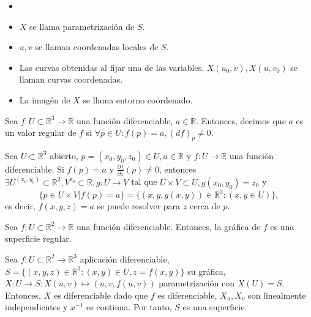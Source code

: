 \begin{nota}
  \begin{itemize}
    \item []
    \item $X$ se llama parametrización de $S$.
    \item $u, v$ se llaman coordenadas locales de $S$.
    \item Las curvas obtenidas al fijar una de las variables, $X(u_{0}, v), X(u, v_{0})$ se llaman curvas coordenadas.
    \item La imagén de $X$ se llama entorno coordenado.
  \end{itemize}
\end{nota} 

\begin{defn}
  Sea $ f: U \subset \mathbb{R}^{3} \to \mathbb{R}$ una función diferenciable, $a \in \mathbb{R}$. Entonces, decimos que $a$ es un valor regular de $f$ si $\forall p \in U : f(p) = a, (df)_{p} \neq 0$.
\end{defn}

\begin{theo}
  Sea $U \subset \mathbb{R}^{3}$ abierto, $p = (x_{0}, y_{0}, z_{0}) \in U, a \in \mathbb{R}$ y $f: U \to \mathbb{R}$ una función diferenciable. Si $f(p) = a$ y $\frac{\partial{f}}{\partial{z}}(p) \neq 0$, entonces $\exists U^{(x_{0},y_{0})} \subset \mathbb{R}^{2}, V^{z_{0}} \subset \mathbb{R}, g: U \to V$ tal que $U \times V \subset U, g(x_{0}, y_{0}) = z_{0}$ y
  \[ 
    \{ p \in U \times V | f(p) = a \} = \big\{ (x,y,g(x,y)) \in \mathbb{R}^{3} : (x,y \in U) \big\} ,
  \] 
  es decir, $f(x,y,z) = a$ se puede resolver para $z$ cerca de $p$.
\end{theo}

\begin{prop}
  Sea $f : U \subset \mathbb{R}^{2} \to \mathbb{R}$ una función diferenciable. Entonces, la gráfica de $f$ es una superficie regular.
\end{prop}

\begin{dem}
  Sea $f : U \subset \mathbb{R}^{2} \to \mathbb{R}^{3}$ aplicación diferenciable, $S = \{ (x, y, z)\in \mathbb{R}^{3} : (x, y) \in U, z = f(x, y) \}$ su gráfica, $X : U \to S : X(u, v) \mapsto (u, v, f(u, v))$ parametrización con $X(U) = S$. Entonces, $X$ es diferenciable dado que $f$ es diferenciable, $X_{u}, X_{v}$ son linealmente independientes y $x^{-1}$ es continua. Por tanto, $S$ es una superficie.
\end{dem}

